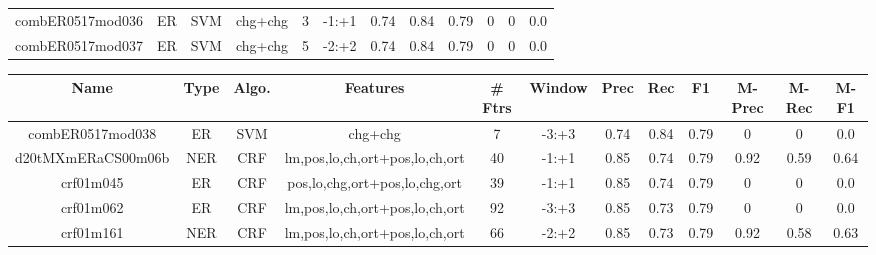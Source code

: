 \documentclass[a4paper]{article}
\begin{document}
\begin{landscape}
\begin{center}
\begin{tabular}{ |c|c|c|c|c|c|c|c|c|c|c|c|}
 	
 		
 		\small{ combER0517mod036 } & ER & SVM & chg+chg  &  3 &  -1:+1  &  0.74 & 0.84 & 0.79  &  0 & 0 & 0.0 \\
 		

 	
 
 	
 		
 		\small{ combER0517mod037 } & ER & SVM & chg+chg  &  5 &  -2:+2  &  0.74 & 0.84 & 0.79  &  0 & 0 & 0.0 \\
 		
 \hline
\end{tabular}
\end{center}




\begin{center}
\begin{tabular}{ |c|c|c|c|c|c|c|c|c|c|c|c|} 
 \hline
 	Name & Type & Algo. & Features & \# Ftrs & Window & Prec & Rec & F1 & M-Prec & M-Rec & M-F1\\
 \hline

 		

 	
 
 	
 		
 		\small{ combER0517mod038 } & ER & SVM & chg+chg  &  7 &  -3:+3  &  0.74 & 0.84 & 0.79  &  0 & 0 & 0.0 \\
 		

 	
 
 	
 		
 		\small{ d20tMXmERaCS00m06b } & NER & CRF & lm,pos,lo,ch,ort+pos,lo,ch,ort  &  40 &  -1:+1  &  0.85 & 0.74 & 0.79  &  0.92 & 0.59 & 0.64 \\
 		

 	
 
 	
 		
 		\small{ crf01m045 } & ER & CRF & pos,lo,chg,ort+pos,lo,chg,ort  &  39 &  -1:+1  &  0.85 & 0.74 & 0.79  &  0 & 0 & 0.0 \\
 		

 	
 
 	
 		
 		\small{ crf01m062 } & ER & CRF & lm,pos,lo,ch,ort+pos,lo,ch,ort  &  92 &  -3:+3  &  0.85 & 0.73 & 0.79  &  0 & 0 & 0.0 \\
 		

 	
 
 	
 		
 		\small{ crf01m161 } & NER & CRF & lm,pos,lo,ch,ort+pos,lo,ch,ort  &  66 &  -2:+2  &  0.85 & 0.73 & 0.79  &  0.92 & 0.58 & 0.63 \\
 		


\end{tabular}
\end{center}
\end{landscape}
\end{document}
